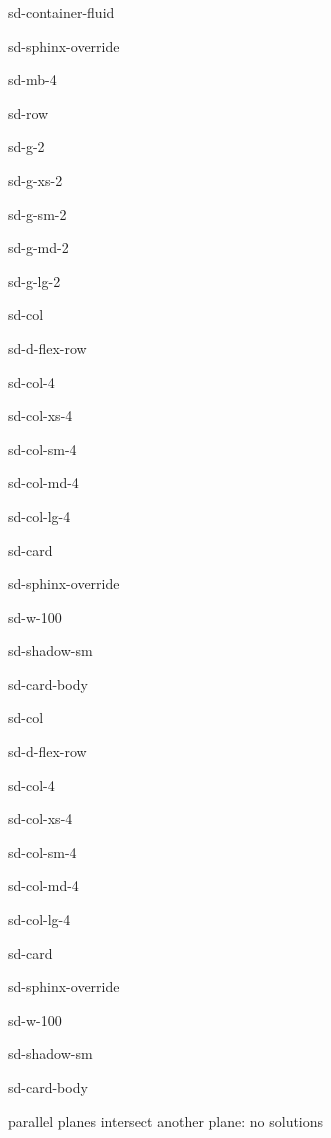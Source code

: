 \documentclass[letterpaper,10pt,english]{jupyterBook}
\begin{document}
\begin{sphinxuseclass}{sd-container-fluid}
\begin{sphinxuseclass}{sd-sphinx-override}
\begin{sphinxuseclass}{sd-mb-4}
\begin{sphinxuseclass}{sd-row}
\begin{sphinxuseclass}{sd-g-2}
\begin{sphinxuseclass}{sd-g-xs-2}
\begin{sphinxuseclass}{sd-g-sm-2}
\begin{sphinxuseclass}{sd-g-md-2}
\begin{sphinxuseclass}{sd-g-lg-2}
\begin{sphinxuseclass}{sd-col}
\begin{sphinxuseclass}{sd-d-flex-row}
\begin{sphinxuseclass}{sd-col-4}
\begin{sphinxuseclass}{sd-col-xs-4}
\begin{sphinxuseclass}{sd-col-sm-4}
\begin{sphinxuseclass}{sd-col-md-4}
\begin{sphinxuseclass}{sd-col-lg-4}
\begin{sphinxuseclass}{sd-card}
\begin{sphinxuseclass}{sd-sphinx-override}
\begin{sphinxuseclass}{sd-w-100}
\begin{sphinxuseclass}{sd-shadow-sm}
\begin{sphinxuseclass}{sd-card-body}
\end{sphinxuseclass}
\end{sphinxuseclass}
\end{sphinxuseclass}
\end{sphinxuseclass}
\end{sphinxuseclass}
\end{sphinxuseclass}
\end{sphinxuseclass}
\end{sphinxuseclass}
\end{sphinxuseclass}
\end{sphinxuseclass}
\end{sphinxuseclass}
\end{sphinxuseclass}
\begin{sphinxuseclass}{sd-col}
\begin{sphinxuseclass}{sd-d-flex-row}
\begin{sphinxuseclass}{sd-col-4}
\begin{sphinxuseclass}{sd-col-xs-4}
\begin{sphinxuseclass}{sd-col-sm-4}
\begin{sphinxuseclass}{sd-col-md-4}
\begin{sphinxuseclass}{sd-col-lg-4}
\begin{sphinxuseclass}{sd-card}
\begin{sphinxuseclass}{sd-sphinx-override}
\begin{sphinxuseclass}{sd-w-100}
\begin{sphinxuseclass}{sd-shadow-sm}
\begin{sphinxuseclass}{sd-card-body}
\begin{figure}[htbp]
\centering

\noindent{}
\end{figure}

 parallel planes intersect another plane: no solutions


\end{sphinxuseclass}
\end{sphinxuseclass}
\end{sphinxuseclass}
\end{sphinxuseclass}
\end{sphinxuseclass}
\end{sphinxuseclass}
\end{sphinxuseclass}
\end{sphinxuseclass}
\end{sphinxuseclass}
\end{sphinxuseclass}
\end{sphinxuseclass}
\end{sphinxuseclass}
\end{sphinxuseclass}
\end{sphinxuseclass}
\end{sphinxuseclass}
\end{sphinxuseclass}
\end{sphinxuseclass}
\end{sphinxuseclass}
\end{sphinxuseclass}
\end{sphinxuseclass}
\end{sphinxuseclass}
\end{document}
